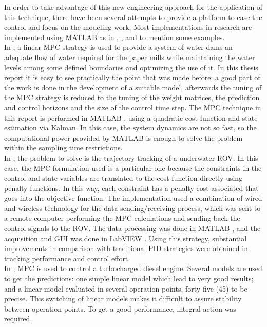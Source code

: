 In order to take advantage of this new engineering approach for the application of this technique, there have been several attempts to provide a platform to ease the control and focus on the modeling work. Most implementations in research are implemented using MATLAB\textsuperscript{\textregistered} as in \cite{Gabrielsson2012}, \cite{Molero2011}, \cite{Kristoffersson2006} and \cite{Johansson2012} to mention some examples.\\

In \cite{Gabrielsson2012}, a linear MPC strategy is used to provide a system of water dams an adequate flow of water required for the paper mills while maintaining the water levels among some defined boundaries and optimizing the use of it. In this thesis report it is easy to see practically the point that was made before: a good part of the work is done in the development of a suitable model, afterwards the tuning of the MPC strategy is reduced to the tuning of the weight matrices, the prediction and control horizons and the size of the control time step. The MPC technique in this report is performed in MATLAB \textsuperscript{\textregistered}, using a quadratic cost function and state estimation via Kalman. In this case, the system dynamics are not so fast, so the computational power provided by MATLAB \textsuperscript{\textregistered} is enough to solve the problem within the sampling time restrictions.\\

In \cite{Molero2011}, the problem to solve is the trajectory tracking of a underwater ROV. In this case, the MPC formulation used is a particular one because the constraints in the control and state variables are translated to the cost function directly using penalty functions. In this way, each constraint has a penalty cost associated that goes into the objective function. The implementation used a combination of wired and wireless technology for the data sending/receiving process, which was sent to a remote computer performing the MPC calculations and sending back the control signals to the ROV. The data processing was done in MATLAB \textsuperscript{\textregistered}, and the acquisition and GUI was done in LabVIEW \texttrademark. Using this strategy, substantial improvements in comparison with traditional PID strategies were obtained in tracking performance and control effort.\\

In \cite{Kristoffersson2006}, MPC is used to control a turbocharged diesel engine. Several models are used to get the predictions: one simple linear model which lead to very good results; and a linear model evaluated in several operation points, forty five (45) to be precise. This switching of linear models makes it difficult to assure stability between operation points. To get a good performance, integral action was required.\\

